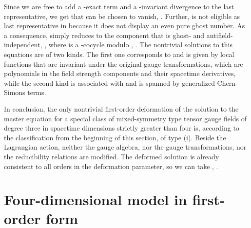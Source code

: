 \documentclass[a4paper,12pt]{article}
\begin{document}
Since we are free to add a \myHighlight{$\gamma $}\coordHE{}-exact term and a \myHighlight{$\gamma $}\coordHE{}-invariant
divergence to the last representative, we get that \coordHE{} can be chosen to
vanish, \coordHE{}. Further, \coordHE{} is not eligible as last representative
in \coordHE{} because it does not display an even pure ghost
number. As a consequence, \coordHE{} simply reduces to the
component that is ghost- and antifield-independent, \coordHE{}, where \coordHE{} is a \myHighlight{$\gamma $}\coordHE{}-cocycle modulo \coordHE{}, \coordHE{}. The nontrivial solutions to
this equations are of two kinds. The first one corresponds to \coordHE{} and is given by local functions that are invariant under the
original gauge transformations, which are polynomials in the field strength
components \coordHE{} and their
spacetime derivatives, while the second kind is associated with \coordHE{} and is spanned by generalized Chern-Simons terms.

In conclusion, the only nontrivial first-order deformation of the solution
to the master equation for a special class of mixed-symmetry type tensor
gauge fields of degree three in spacetime dimensions strictly greater than
four is, according to the classification from the beginning of this section,
of type (i). Beside the Lagrangian action, neither the gauge algebra, nor
the gauge transformations, nor the reducibility relations are modified. The
deformed solution \coordHE{} is already
consistent to all orders in the deformation parameter, so we can take \coordHE{}, \coordHE{}.

\section{Four-dimensional model in first-order form}
\end{document}
